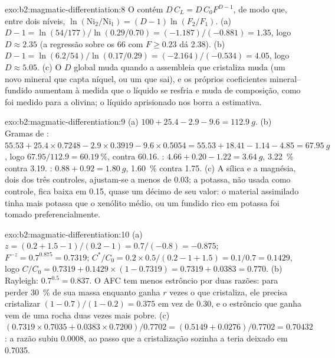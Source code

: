 \begin{solution}{exo:b2:magmatic-differentiation:8}
O  contém $D\,C_L = D\,C_0F^{D-1}$, de modo que, entre dois níveis,
$\ln(\mathrm{Ni}_2/\mathrm{Ni}_1) = (D - 1)\ln(F_2/F_1)$. (a) $D - 1 = \ln(54/177)/
\ln(0.29/0.70) = (-1.187)/(-0.881) = 1.35$, logo $D \approx 2.35$ (a regressão sobre
os 66  com $F \ge 0.23$ dá 2.38). (b) $D - 1 = \ln(6.2/54)/\ln(0.17/0.29) = (-2.164)/(-0.534)
= 4.05$, logo $D \approx 5.05$. (c) O $D$ global muda quando a assembleia que
cristaliza muda (um novo mineral que capta níquel, ou um que sai), e os
próprios coeficientes mineral--fundido aumentam à medida que o líquido se resfria e muda de
composição, como foi medido para a olivina; o líquido aprisionado nos  borra a
estimativa.
\end{solution}

\begin{solution}{exo:b2:magmatic-differentiation:9}
(a) $100 + 25.4 - 2.9 - 9.6 = \qty{112.9}{g}$. (b) Gramas de : $55.53 +
25.4\times0.7248 - 2.9\times0.3919 - 9.6\times0.5054 = 55.53 + 18.41 - 1.14 - 4.85 =
\qty{67.95}{g}$, logo $67.95/112.9 = \qty{60.19}{\percent}$, contra 60.16. :
$4.66 + 0.20 - 1.22 = \qty{3.64}{g}$, \qty{3.22}{\percent} contra 3.19. :
$0.88 + 0.92 = \qty{1.80}{g}$, \qty{1.60}{\percent} contra 1.75. (c) A sílica e a magnésia, dois dos três
controles, ajustam-se a menos de 0.03; a potassa, não usada como controle, fica baixa em 0.15, quase um
décimo de seu valor: o material assimilado tinha mais potassa que o xenólito
médio, ou um fundido rico em potassa foi tomado preferencialmente.
\end{solution}

\begin{solution}{exo:b2:magmatic-differentiation:10}
(a) $z = (0.2 + 1.5 - 1)/(0.2 - 1) = 0.7/(-0.8) = -0.875$; $F^{-z} = 0.7^{0.875} =
0.7319$; $C^*/C_0 = 0.2\times0.5/(0.2 - 1 + 1.5) = 0.1/0.7 = 0.1429$, logo $C/C_0 =
0.7319 + 0.1429\times(1 - 0.7319) = 0.7319 + 0.0383 = 0.770$. (b) Rayleigh:
$0.7^{0.5} = 0.837$. O  AFC tem menos estrôncio por duas razões: para perder
\qty{30}{\percent} de sua massa enquanto ganha $r$ vezes o que cristaliza, ele precisa
cristalizar $(1 - 0.7)/(1 - 0.2) = 0.375$ em vez de 0.30, e o estrôncio que ganha
vem de uma rocha duas vezes mais pobre. (c) $(0.7319\times0.7035 + 0.0383\times0.7200)/0.7702
= (0.5149 + 0.0276)/0.7702 = 0.70432$: a razão subiu 0.0008, ao passo que a
cristalização sozinha a teria deixado em 0.7035.
\end{solution}

